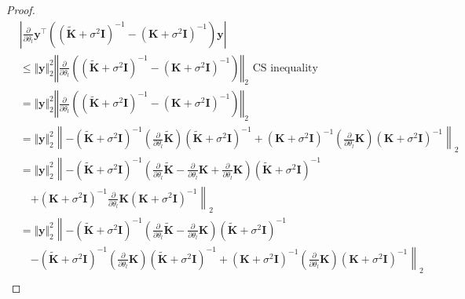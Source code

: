 \begin{proof}
\begin{align*}
    &\left\vert \frac{\partial}{\partial \theta_l}\mathbf{y}^\top \left( (\tilde{\mathbf{K}} + \sigma^2 \mathbf{I})^{-1} - (\mathbf{K} + \sigma^2 \mathbf{I})^{-1} \right) \mathbf{y}\right\vert\\
    &\leq\Vert \textbf{y}\Vert_2^2 \left\Vert \frac{\partial}{\partial \theta_l }\left( (\tilde{\mathbf{K}} + \sigma^2 \mathbf{I})^{-1} - (\mathbf{K} + \sigma^2 \mathbf{I})^{-1} \right) \right\Vert_2\text{ CS inequality}\\
    &=\Vert \textbf{y}\Vert_2^2  \left\Vert \frac{\partial}{\partial \theta_l }\left( (\tilde{\mathbf{K}} + \sigma^2 \mathbf{I})^{-1} - (\mathbf{K} + \sigma^2 \mathbf{I})^{-1} \right) \right\Vert_2\\
    &= \Vert \textbf{y}\Vert_2^2 \left\|  - (\tilde{\mathbf{K}} + \sigma^2 \mathbf{I})^{-1} \left(\frac{\partial}{\partial \theta_l} \tilde{\mathbf{K}}\right) (\tilde{\mathbf{K}} + \sigma^2 \mathbf{I})^{-1} + (\mathbf{K} + \sigma^2 \mathbf{I})^{-1} \left(\frac{\partial}{\partial \theta_l} \mathbf{K}\right) (\mathbf{K} + \sigma^2 \mathbf{I})^{-1}  \right\|_2 \\
    &= \Vert \textbf{y}\Vert_2^2 \left\|  - (\tilde{\mathbf{K}} + \sigma^2 \mathbf{I})^{-1} \left(\frac{\partial}{\partial \theta_l} \tilde{\mathbf{K}} - \frac{\partial}{\partial \theta_l} \mathbf{K} + \frac{\partial}{\partial \theta_l} \mathbf{K}\right) (\tilde{\mathbf{K}} + \sigma^2 \mathbf{I})^{-1} \right.\\
    &\quad \left. + (\mathbf{K} + \sigma^2 \mathbf{I})^{-1} \frac{\partial}{\partial \theta_l} \mathbf{K} (\mathbf{K} + \sigma^2 \mathbf{I})^{-1}  \right\|_2 \\
    &= \Vert \textbf{y}\Vert_2^2 \left\|  - (\tilde{\mathbf{K}} + \sigma^2 \mathbf{I})^{-1} \left(\frac{\partial}{\partial \theta_l} \tilde{\mathbf{K}} - \frac{\partial}{\partial \theta_l} \mathbf{K}\right) (\tilde{\mathbf{K}} + \sigma^2 \mathbf{I})^{-1} \right.\\
    &\quad \left. - (\tilde{\mathbf{K}} + \sigma^2 \mathbf{I})^{-1} \left(\frac{\partial}{\partial \theta_l} \mathbf{K}\right) (\tilde{\mathbf{K}} + \sigma^2 \mathbf{I})^{-1}  + (\mathbf{K} + \sigma^2 \mathbf{I})^{-1} \left(\frac{\partial}{\partial \theta_l} \mathbf{K}\right) (\mathbf{K} + \sigma^2 \mathbf{I})^{-1}  \right\|_2 \\

\end{align*}
\end{proof}

